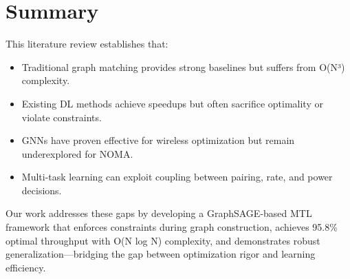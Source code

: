 \section{Summary}

This literature review establishes that:

\begin{itemize}
    \item Traditional graph matching provides strong baselines but suffers from O(N³) complexity.
    \item Existing DL methods achieve speedups but often sacrifice optimality or violate constraints.
    \item GNNs have proven effective for wireless optimization but remain underexplored for NOMA.
    \item Multi-task learning can exploit coupling between pairing, rate, and power decisions.
\end{itemize}

Our work addresses these gaps by developing a GraphSAGE-based MTL framework that enforces constraints during graph construction, achieves 95.8\% optimal throughput with O(N log N) complexity, and demonstrates robust generalization—bridging the gap between optimization rigor and learning efficiency.
